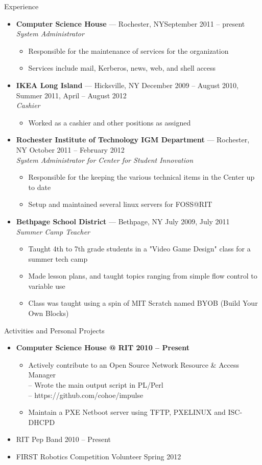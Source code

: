 \documentclass[10pt,oneside]{article}
\newenvironment{ressection}[1]{
	\vspace{3pt}
	{\fontfamily{ppl}\selectfont\Large#1}
	\begin{itemize}
	\vspace{2pt}
}{
	\end{itemize}
}
\newcommand{\resitem}[1]{
	\vspace{-2pt}
	\item \begin{flushleft} #1 \end{flushleft}
}
\newcommand{\ressubitem}[1]{
	\vspace{-1pt}
	\item \begin{flushleft} #1 \end{flushleft}
}
\newcommand{\resbigitem}[3]{
	\vspace{-3pt}
	\item
	\textbf{#1} --- #2 \\
	\textit{#3}
}
\newenvironment{ressubsec}[3]{
	\resbigitem{#1}{#2}{#3}
	\vspace{-1pt}
	\begin{itemize}
}{
	\end{itemize}
}
\newenvironment{reslist}[1]{
	\resitem{\textbf{#1}}
	\vspace{-3pt}
	\begin{itemize}
}{
	\end{itemize}
}
\begin{document}
\begin{ressection}{Experience}

	\begin{ressubsec}{Computer Science House}{Rochester, NY\hfill September 2011 -- present}{System Administrator}
		\ressubitem{Responsible for the maintenance of services for the organization}
		\ressubitem{Services include mail, Kerberos, news, web, and shell access}
	\end{ressubsec}
	\begin{ressubsec}{IKEA Long Island}{Hicksville, NY \hfill December 2009 -- August 2010,  Summer 2011,  April -- August 2012}{Cashier}
		\ressubitem{Worked as a cashier and other positions as assigned}
	\end{ressubsec}
	\begin{ressubsec}{Rochester Institute of Technology IGM Department}{Rochester, NY \hfill October 2011 -- February 2012}{System Administrator for Center for Student Innovation}
		\ressubitem{Responsible for the keeping the various technical items in the Center up to date}
		\ressubitem{Setup and maintained several linux servers for FOSS@RIT}
	\end{ressubsec}
	\begin{ressubsec}{Bethpage School District}{Bethpage, NY \hfill July 2009,  July 2011}{Summer Camp Teacher}
		\ressubitem{Taught 4th to 7th grade students in a "Video Game Design" class for a summer tech camp}
		\ressubitem{Made lesson plans, and taught topics ranging from simple flow control to variable use}
		\ressubitem{Class was taught using a spin of MIT Scratch named BYOB (Build Your Own Blocks)}
	\end{ressubsec}

\end{ressection}


\begin{ressection}{Activities and Personal Projects}
	\begin{reslist}{Computer Science House @ RIT \hfill 2010 -- Present}
		\ressubitem{Actively contribute to an Open Source Network Resource \& Access Manager \\
			\hspace{8pt} -- Wrote the main output script in PL/Perl \\ 
			\hspace{8pt} -- https://github.com/cohoe/impulse}
		\ressubitem{Maintain a PXE Netboot server using TFTP, PXELINUX and ISC-DHCPD}
	\end{reslist}
	\resitem{RIT Pep Band \hfill 2010 -- Present}
	\resitem{FIRST Robotics Competition Volunteer \hfill Spring 2012}
\end{ressection}
\end{document}
